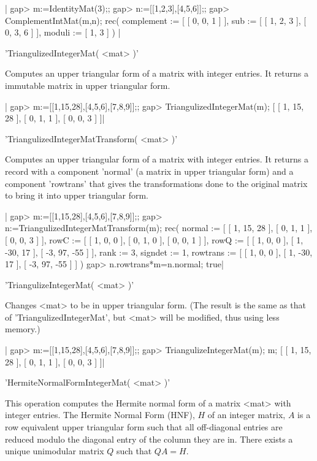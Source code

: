 |    gap> m:=IdentityMat(3);;
    gap> n:=[[1,2,3],[4,5,6]];;
    gap> ComplementIntMat(m,n);
    rec( complement := [ [ 0, 0, 1 ] ], sub := [ [ 1, 2, 3 ], [ 0, 3, 6 ] ],
      moduli := [ 1, 3 ] ) |

'TriangulizedIntegerMat( <mat> )'

Computes  an upper  triangular form  of a  matrix with  integer entries. It
returns a immutable matrix in upper triangular form.

|    gap> m:=[[1,15,28],[4,5,6],[7,8,9]];;
    gap> TriangulizedIntegerMat(m);
    [ [ 1, 15, 28 ], [ 0, 1, 1 ], [ 0, 0, 3 ] ]|

'TriangulizedIntegerMatTransform( <mat> )'

Computes  an upper  triangular form  of a  matrix with  integer entries. It
returns  a record with  a component 'normal'  (a matrix in upper triangular
form) and a component 'rowtrans' that gives the transformations done to the
original matrix to bring it into upper triangular form.

|    gap> m:=[[1,15,28],[4,5,6],[7,8,9]];;
    gap> n:=TriangulizedIntegerMatTransform(m);
    rec( normal := [ [ 1, 15, 28 ], [ 0, 1, 1 ], [ 0, 0, 3 ] ],
      rowC := [ [ 1, 0, 0 ], [ 0, 1, 0 ], [ 0, 0, 1 ] ],
      rowQ := [ [ 1, 0, 0 ], [ 1, -30, 17 ], [ -3, 97, -55 ] ], rank := 3,
      signdet := 1, rowtrans := [ [ 1, 0, 0 ], [ 1, -30, 17 ], [ -3, 97, -55 ] ] )
    gap> n.rowtrans*m=n.normal;
    true|

'TriangulizeIntegerMat( <mat> )'

Changes  <mat> to be in  upper triangular form. (The  result is the same as
that  of 'TriangulizedIntegerMat', but  <mat> will be  modified, thus using
less memory.)

|    gap> m:=[[1,15,28],[4,5,6],[7,8,9]];;
    gap> TriangulizeIntegerMat(m); m;
    [ [ 1, 15, 28 ], [ 0, 1, 1 ], [ 0, 0, 3 ] ]|

'HermiteNormalFormIntegerMat( <mat> )'

This  operation computes  the Hermite  normal form  of a  matrix <mat> with
integer  entries. The Hermite Normal Form  (HNF), $H$ of an integer matrix,
$A$  is a row  equivalent upper triangular  form such that all off-diagonal
entries  are reduced modulo the  diagonal entry of the  column they are in.
There exists a unique unimodular matrix $Q$ such that $QA = H$.

